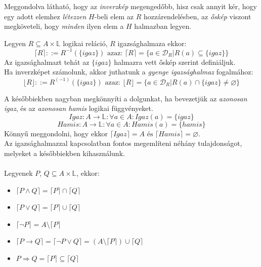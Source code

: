 \documentclass[12pt]{article}
\begin{document}
Meggondolva látható, hogy az \textit{inverzkép} megengedőbb, hisz csak annyit kér, hogy egy adott elemhez \textit{létezzen} $H$-beli elem az $R$ hozzárendelésben, az \textit{őskép} viszont megköveteli, hogy \textit{minden} ilyen elem a $H$ halmazban legyen.

Legyen $R \subseteq A \times \mathbb{L}$ logikai reláció, $R$ igazsághalmaza ekkor:
$$  \lceil R \rceil ::= R^{-1}(\{igaz\}) \text{ azaz: } \lceil R \rceil = \{a \in \mathcal{D}_R | R(a) \subseteq \{igaz\} \} $$
Az igazsághalmazt tehát az $\{igaz\}$ halmazra vett őskép szerint definiáljuk.\\
Ha inverzképet számolunk, akkor juthatunk a \textit{gyenge igazsághalmaz} fogalmához:
$$  \lfloor R \rfloor ::= R^{(-1)}(\{igaz\}) \text{ azaz: } \lfloor R \rfloor = \{a \in \mathcal{D}_R | R(a) \cap \{igaz\} \ne \varnothing \} $$

A későbbiekben nagyban megkönnyíti a dolgunkat, ha bevezetjük az \textit{azonosan igaz}, és az \textit{azonosan hamis} logikai függvényeket.
$$Igaz: A \rightarrow \mathbb{L}: \forall a \in A: Igaz(a) = \{igaz\} $$
$$Hamis: A \rightarrow \mathbb{L}: \forall a \in A: Hamis(a) = \{hamis\} $$
Könnyű meggondolni, hogy ekkor $\lceil Igaz \rceil = A \text{ és } \lceil Hamis \rceil = \varnothing $.\\
Az igazsághalmazzal kapcsolatban fontos megemlíteni néhány tulajdonságot, melyeket a későbbiekben kihasználunk.\\
\\
Legyenek $P$, $Q \subseteq A \times \mathbb{L}$, ekkor:
\begin{itemize}
	\item $ \lceil P \land Q \rceil = \lceil P \rceil \cap \lceil Q \rceil $
	\item $ \lceil P \lor Q \rceil = \lceil P \rceil \cup \lceil Q \rceil  $
	\item $	\lceil \neg P \rceil = A \setminus \lceil P \rceil  $
	\item $\lceil P \rightarrow Q \rceil = \lceil \neg P \lor Q \rceil = (A \setminus \lceil P \rceil) \cup \lceil Q \rceil $
	\item $ P \Rightarrow Q = \lceil P \rceil \subseteq \lceil Q \rceil $
\end{itemize}
\end{document}
